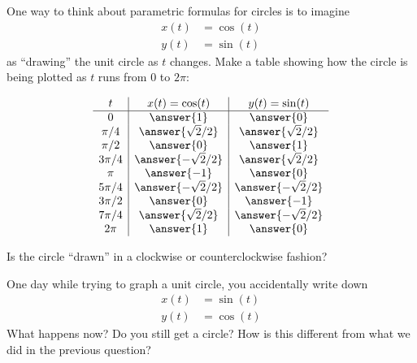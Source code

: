 \documentclass{ximera}
\begin{document}
\begin{question}
  One way to think about parametric formulas for circles is to
  imagine
  \begin{align*}
    x(t) &= \cos(t)\\
    y(t) &= \sin(t) 
  \end{align*}
  as ``drawing'' the unit circle as $t$ changes. Make a table showing
  how the circle is being plotted as $t$ runs from $0$ to $2\pi$:
  \begin{prompt}
    \[
    \begin{array}{c|c|c}
      t      & x(t) = \cos(t) & y(t) = \sin(t)\\ \hline
      0      & \answer{1}              & \answer{0}\\
      \pi/4  & \answer{\sqrt{2}/2}     & \answer{\sqrt{2}/2}\\
      \pi/2  & \answer{0}              & \answer{1}\\
      3\pi/4 & \answer{-\sqrt{2}/2}    & \answer{\sqrt{2}/2}\\
      \pi    & \answer{-1}             & \answer{0}\\
      5\pi/4 & \answer{-\sqrt{2}/2}    & \answer{-\sqrt{2}/2}\\
      3\pi/2 & \answer{0}              & \answer{-1}\\
      7\pi/4 & \answer{\sqrt{2}/2}     & \answer{-\sqrt{2}/2}\\
      2\pi   & \answer{1}              & \answer{0}
    \end{array}
    \]
  \end{prompt}
  \begin{question}
    Is the circle ``drawn'' in a clockwise or counterclockwise fashion?
    \begin{prompt}
      \begin{multipleChoice}
      \end{multipleChoice}
    \end{prompt}
    \begin{question}
      One day while trying to graph a unit circle, you accidentally
      write down
      \begin{align*}
        x(t) &= \sin(t)\\
        y(t) &= \cos(t) 
      \end{align*}
      What happens now? Do you still get a circle? How is this different
      from what we did in the previous question?
      \begin{prompt}
        \begin{multipleChoice}
        

\end{multipleChoice}
\end{prompt}
\end{question}
\end{question}
\end{question}
\end{document}
